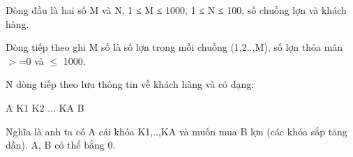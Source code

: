 Dòng đầu là hai số M và N, 1 ≤ M ≤ 1000, 1 ≤ N ≤ 100, số chuồng lợn và khách hàng.  

   Dòng tiếp theo ghi M số là số lợn trong mỗi chuồng (1,2..,M), số lợn thỏa mãn $>$=0 và  $\le$ 1000.  

   N dòng tiếp theo lưu thông tin về khách hàng và có dạng:  

   A K1 K2 ... KA B  

   Nghĩa là anh ta có A cái khóa K1,..,KA và muốn mua B lợn (các khóa sắp  tăng dần). A, B có thể bằng 0.